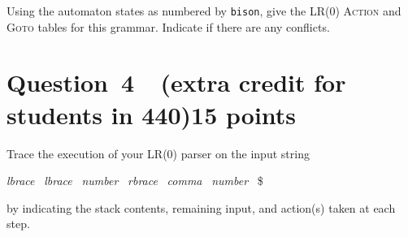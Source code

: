\documentclass[10pt]{article}
\begin{document}
Using the automaton states as numbered by {\tt bison},
give the LR(0) \textsc{Action} and \textsc{Goto} tables
for this grammar.
Indicate if there are any conflicts.


\section*{Question~4~~(extra credit for students in 440)\hfill 15 points}

Trace the execution of your LR(0) parser on the input string
\begin{center}
\emph{lbrace}  ~\emph{lbrace}  ~\emph{number}  ~\emph{rbrace}
 ~\emph{comma}  ~\emph{number} ~\$
\end{center}
by indicating the stack contents, remaining input, and
action(s) taken at each step.
\end{document}
